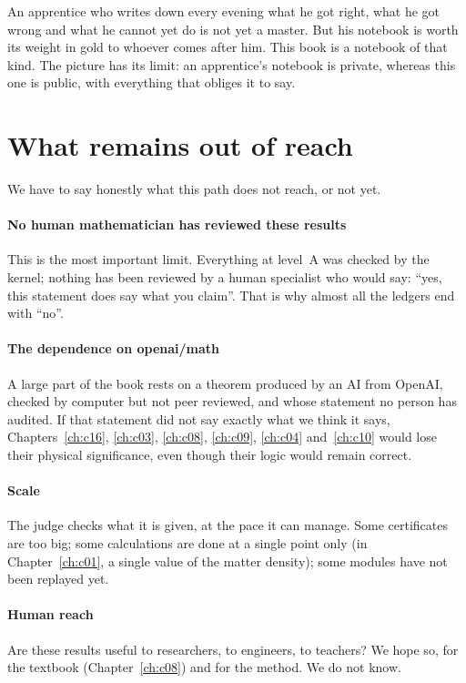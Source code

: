 \begin{analogie}
An apprentice who writes down every evening what he got right, what he got wrong and what he cannot yet do is not yet a
master. But his notebook is worth its weight in gold to whoever comes after him. This book is a notebook of that kind.
The picture has its limit: an apprentice's notebook is private, whereas this one is public, with everything that
obliges it to say.
\end{analogie}

\section{What remains out of reach}

We have to say honestly what this path does not reach, or not yet.

\paragraph{No human mathematician has reviewed these results} This is the most important limit. Everything at level~A
was checked by the kernel; nothing has been reviewed by a human specialist who would say: ``yes, this statement does
say what you claim''. That is why almost all the ledgers end with ``no''.

\paragraph{The dependence on openai/math} A large part of the book rests on a theorem produced by an AI from OpenAI,
checked by computer but not peer reviewed, and whose statement no person has audited. If that statement did not say
exactly what we think it says, Chapters~\ref{ch:c16}, \ref{ch:c03}, \ref{ch:c08}, \ref{ch:c09}, \ref{ch:c04} and~\ref{ch:c10} would
lose their physical significance, even though their logic would remain correct.

\paragraph{Scale} The judge checks what it is given, at the pace it can manage. Some certificates are too big; some
calculations are done at a single point only (in Chapter~\ref{ch:c01}, a single value of the matter density); some
modules have not been replayed yet.

\paragraph{Human reach} Are these results useful to researchers, to engineers, to teachers? We hope so, for the
textbook (Chapter~\ref{ch:c08}) and for the method. We do not know.

